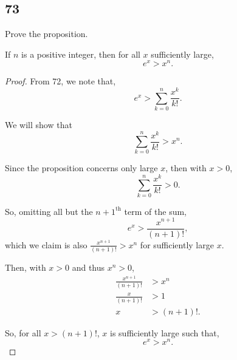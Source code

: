 \documentclass[../hw8]{subfiles}
\begin{document}
\subsection*{73}
Prove the proposition.

\begin{proposition}
    If $n$ is a positive integer, then for all $x$ sufficiently large, \[e^x>x^n.\]
\end{proposition}

\begin{proof}
    From 72, we note that, \[e^x>\sum\limits_{k=0}^{n}\frac{x^k}{k!}.\]

    We will show that \[\sum\limits_{k=0}^{n}\frac{x^k}{k!}>x^n.\]
    
    Since the proposition concerns only large $x$, then with $x>0$, 
    \[\sum\limits_{k=0}^{n}\frac{x^k}{k!}>0.\] 

    So, omitting all but the ${n+1}^{\text{th}}$ term of the sum, \[e^x>\frac{x^{n+1}}{(n+1)!},\]
    which we claim is also $\frac{x^{n+1}}{(n+1)!}>x^n$ for sufficiently large $x$.

    Then, with $x>0$ and thus $x^n>0$,
    \begin{align*}
        \frac{x^{n+1}}{(n+1)!} &> x^n \\
        \frac{x}{(n+1)!} &> 1 \\
        x &> (n+1)!.
    \end{align*}

    So, for all $x>{(n+1)!}$, $x$ is sufficiently large such that, 
    \[e^x>x^n.\]


\end{proof}
\end{document}
